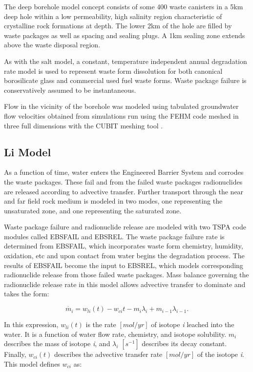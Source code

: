 The deep borehole model concept consists of some 400 waste canisters in a 5km 
deep hole within a low permeability, high salinity region characteristic of 
crystalline rock formations at depth. The lower 2km of the hole are filled 
by waste packages as well as spacing and sealing plugs. A 1km sealing zone 
extends above the waste disposal region.

As with the salt model, a constant, temperature independent annual degradation
rate model is used to represent waste form dissolution for both canonical 
borosilicate glass and commercial used fuel waste forms. Waste package failure 
is conservatively assumed to be instantaneous.

Flow in the vicinity of the borehole was modeled using tabulated groundwater 
flow velocities obtained from simulations run using the \gls{FEHM} code 
meshed in three full dimensions with the \gls{CUBIT} meshing tool 
\cite{clayton_generic_2011}.

\subsection{Li Model\cite{li_methodology_2006}} As a function of time, water
enters the Engineered Barrier System and corrodes the waste packages.  These
fail and from the failed waste packages radionuclides are released according to
advective transfer.  Further transport through the near and far field rock
medium is modeled in two modes, one representing the unsaturated zone, and one
representing the saturated zone.

Waste package failure and radionuclide release are modeled with two TSPA
code modules called EBSFAIL and EBSREL. The waste package failure rate is
determined from EBSFAIL, which incorporates waste form chemistry, humidity,
oxidation, etc and upon contact from water begins the degradation process. The
results of EBSFAIL become the input to EBSREL, which models corresponding
radionuclide release from those failed waste packages. Mass balance governing the
radionuclide release rate in this model allows advective transfer to dominate and
takes the form:

\begin{equation}
\dot{m_i}=w_{li}(t)-w_{ci}{t}-m_i\lambda_i+m_{i-1}\lambda_{i-1}.\nonumber
\end{equation}

In this expression, $w_{li}(t)$ is the rate $[mol/yr]$ of isotope \emph{i}
leached into the water.  It is a function of water flow rate, chemistry, and
isotope solubility. $m_i$ describes the mass of isotope \emph{i}, and
$\lambda_i$ $[s^{-1}]$ describes its decay constant. Finally, $w_{ci}(t)$
describes the advective transfer rate $[mol/yr]$ of the isotope \emph{i}. This 
model defines $w_{ci}$ as:


